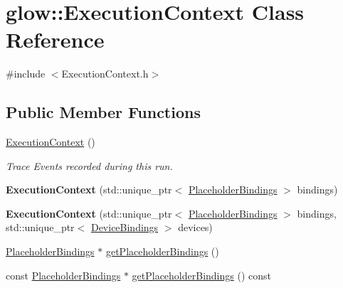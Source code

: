 \hypertarget{classglow_1_1_execution_context}{}\section{glow\+:\+:Execution\+Context Class Reference}
\label{classglow_1_1_execution_context}


{\ttfamily \#include $<$Execution\+Context.\+h$>$}

\subsection*{Public Member Functions}
\begin{DoxyCompactItemize}
\item 
\mbox{\label{classglow_1_1_execution_context_a2c83ff142ac1034d32f1e7cea8641b82}} 
\hyperlink{classglow_1_1_execution_context_a2c83ff142ac1034d32f1e7cea8641b82}{Execution\+Context} ()
\begin{DoxyCompactList}\small\item\em Trace Events recorded during this run. \end{DoxyCompactList}\item 
\mbox{\label{classglow_1_1_execution_context_a67e137ead22a7b1ec385cc05649e90ce}} 
{\bfseries Execution\+Context} (std\+::unique\+\_\+ptr$<$ \hyperlink{classglow_1_1_placeholder_bindings}{Placeholder\+Bindings} $>$ bindings)
\item 
\mbox{\label{classglow_1_1_execution_context_ad41253f57ca17adc5144141398f7a2d0}} 
{\bfseries Execution\+Context} (std\+::unique\+\_\+ptr$<$ \hyperlink{classglow_1_1_placeholder_bindings}{Placeholder\+Bindings} $>$ bindings, std\+::unique\+\_\+ptr$<$ \hyperlink{classglow_1_1_device_bindings}{Device\+Bindings} $>$ devices)
\item 
\hyperlink{classglow_1_1_placeholder_bindings}{Placeholder\+Bindings} $\ast$ \hyperlink{classglow_1_1_execution_context_a12a98468e7e9884864da752c7bf14c40}{get\+Placeholder\+Bindings} ()
\item 
const \hyperlink{classglow_1_1_placeholder_bindings}{Placeholder\+Bindings} $\ast$ \hyperlink{classglow_1_1_execution_context_a67b9cf8da73f45da3aba2a250164dfb3}{get\+Placeholder\+Bindings} () const
\item 

\end{DoxyCompactItemize}
